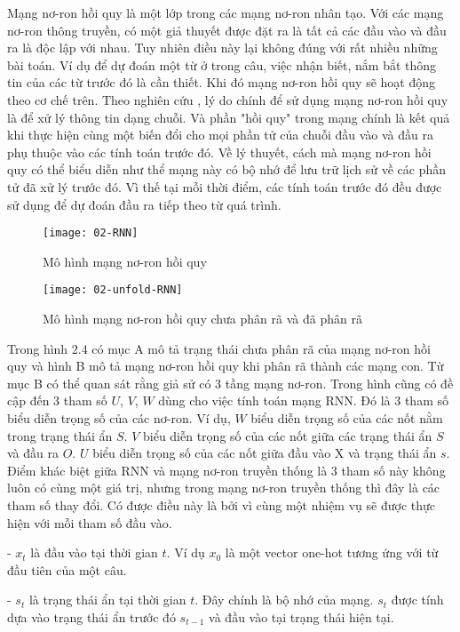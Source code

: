 \documentclass[../main.tex]{subfiles}
\begin{document}
Mạng nơ-ron hồi quy là một lớp trong các mạng nơ-ron nhân tạo. Với các mạng nơ-ron thông truyền, có một giả thuyết được đặt ra là tất cả các đầu vào và đầu ra là độc lập với nhau. Tuy nhiên điều này lại không đúng với rất nhiều những bài toán. Ví dụ để dự đoán một từ ở trong câu, việc nhận biết, nắm bắt thông tin của các từ trước đó là cần thiết. Khi đó mạng nơ-ron hồi quy sẽ hoạt động theo cơ chế trên. Theo nghiên cứu \cite{liu2014recursive}, lý do chính để sử dụng mạng nơ-ron hồi quy là để xử lý thông tin dạng chuỗi. Và phần "hồi quy" trong mạng chính là kết quả khi thực hiện cùng một biến đổi cho mọi phần tử của chuỗi đầu vào và đầu ra phụ thuộc vào các tính toán trước đó. Về lý thuyết, cách mà mạng nơ-ron hồi quy có thể biểu diễn như thể mạng này có bộ nhớ để lưu trữ lịch sử về các phần tử đã xử lý trước đó. Vì thế tại mỗi thời điểm, các tính toán trước đó đều được sử dụng để dự đoán đầu ra tiếp theo từ quá trình. 

\begin{figure}[t]
\centering
\texttt{[image: 02-RNN]}
\caption{Mô hình mạng nơ-ron hồi quy}
\end{figure}

\begin{figure}[t]
\centering
\texttt{[image: 02-unfold-RNN]}
\caption{Mô hình mạng nơ-ron hồi quy chưa phân rã và đã phân rã}
\end{figure}

Trong hình $2.4$ có mục A mô tả trạng thái chưa phân rã của mạng nơ-ron hồi quy và hình B mô tả mạng nơ-ron hồi quy khi phân rã thành các mạng con. Từ mục B có thể quan sát rằng giả sử có $3$ tầng mạng nơ-ron. Trong hình cũng có đề cập đến $3$ tham số $U$, $V$, $W$ dùng cho việc tính toán mạng RNN. Đó là $3$ tham số biểu diễn trọng số của các nơ-ron. Ví dụ, $W$ biểu diễn trọng số của các nốt nằm trong trạng thái ẩn $S$. $V$ biểu diễn trọng số của các nốt giữa các trạng thái ẩn $S$ và đầu ra $O$. $U$ biểu diễn trọng số của các nốt giữa đầu vào X và trạng thái ẩn $s$. Điểm khác biệt giữa RNN và mạng nơ-ron truyền thống là $3$ tham số này không luôn có cùng một giá trị, nhưng trong mạng nơ-ron truyền thống thì đây là các tham số thay đổi. Có được điều này là bởi vì cùng một nhiệm vụ sẽ được thực hiện với mỗi tham số đầu vào. 

- $x_{t}$ là đầu vào tại thời gian $t$. Ví dụ $x_0$ là một vector one-hot tương ứng với từ đầu tiên của một câu. 

- $s_{t}$ là trạng thái ẩn tại thời gian $t$. Đây chính là bộ nhớ của mạng. $s_{t}$ được tính dựa vào trạng thái ẩn trước đó $s_{t-1}$ và đầu vào tại trạng thái hiện tại.
\end{document}
